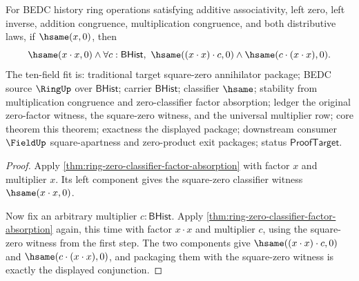 \begin{theorem}
\label{thm:ring-zero-classifier-square-annihilator-package}
For BEDC history ring operations satisfying additive associativity, left zero,
left inverse, addition congruence, multiplication congruence, and both
distributive laws, if $\hsame(x,0)$, then
$$
\hsame(x\cdot x,0)\land
\forall c:\mathsf{BHist},\ \hsame((x\cdot x)\cdot c,0)\land
\hsame(c\cdot(x\cdot x),0).
$$
The ten-field fit is: traditional target square-zero annihilator package; BEDC
source $\RingUp$ over $\mathsf{BHist}$; carrier $\mathsf{BHist}$; classifier
$\hsame$; stability from multiplication congruence and zero-classifier factor
absorption; ledger the original zero-factor witness, the square-zero witness,
and the universal multiplier row; core theorem this theorem; exactness the
displayed package; downstream consumer $\FieldUp$ square-apartness and
zero-product exit packages; status $\mathsf{ProofTarget}$.
\end{theorem}
\begin{proof}
Apply \autoref{thm:ring-zero-classifier-factor-absorption} with factor $x$ and
multiplier $x$. Its left component gives the square-zero classifier witness
$\hsame(x\cdot x,0)$.

Now fix an arbitrary multiplier $c:\mathsf{BHist}$. Apply
\autoref{thm:ring-zero-classifier-factor-absorption} again, this time with
factor $x\cdot x$ and multiplier $c$, using the square-zero witness from the
first step. The two components give $\hsame((x\cdot x)\cdot c,0)$ and
$\hsame(c\cdot(x\cdot x),0)$, and packaging them with the square-zero witness
is exactly the displayed conjunction.
\end{proof}

